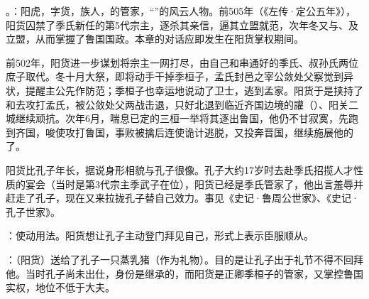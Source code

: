 {
\item {}。：阳虎，字货，族人，的管家，“”的风云人物。前505年（《左传·定公五年》），阳货囚禁了季氏新任的第5代宗主，逐杀其亲信，逼其立盟就范，次年冬又与、及立盟，从而掌握了鲁国国政。本章的对话应即发生在阳货掌权期间。%

前502年，阳货进一步谋划将宗主一网打尽，由自己和串通好的季氏、叔孙氏两位庶子取代。冬十月大祭，即将动手干掉季桓子，孟氏封邑之宰公敛处父察觉到异状，提醒主公先作防范；季桓子也幸运地说动了卫士，逃到孟家。阳货于是挟持了和去攻打孟氏，被公敛处父两战击退，只好北退到临近齐国边境的讙（）、阳关二城继续顽抗。次年6月，喘息已定的三桓一举将其逐出鲁国，他仍不甘寂寞，先跑到齐国，唆使攻打鲁国，事败被擒后连使诡计逃脱，又投奔晋国，继续施展他的了。

阳货比孔子年长，据说身形相貌与孔子很像。孔子大约17岁时去赴季氏招揽人才性质的宴会（当时是第3代宗主季武子在位），阳货已经是季氏管家了，他出言羞辱并赶走了孔子，现在又来拉拢孔子替自己效力。事见《史记·鲁周公世家》、《史记·孔子世家》。

：使动用法。阳货想让孔子主动登门拜见自己，形式上表示臣服顺从。

\item {}：（阳货）送给了孔子一只蒸乳猪（作为礼物）。目的是让孔子出于礼节不得不回拜他。当时孔子尚未出仕，身份是继承的，而阳货是正卿季桓子的管家，又掌控鲁国实权，地位不低于大夫。

}
